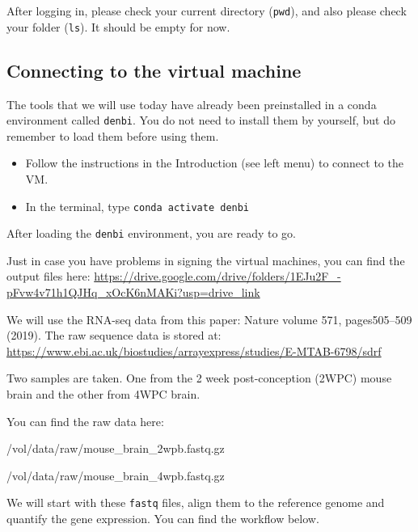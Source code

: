\documentclass[
]{book}
\newenvironment{Shaded}{\begin{snugshade}}{\end{snugshade}}
\newcommand{\NormalTok}[1]{#1}
\providecommand{\tightlist}{%
  \setlength{\itemsep}{0pt}\setlength{\parskip}{0pt}}
\begin{document}
After logging in, please check your current directory (\texttt{pwd}), and also please check your folder (\texttt{ls}). It should be empty for now.

\hypertarget{connecting-to-the-virtual-machine}{%
\subsection{Connecting to the virtual machine}\label{connecting-to-the-virtual-machine}}

The tools that we will use today have already been preinstalled in a conda environment called \texttt{denbi}. You do not need to install them by yourself, but do remember to load them before using them.

\begin{itemize}
\tightlist
\item
  Follow the instructions in the Introduction (see left menu) to connect to the VM.
\item
  In the terminal, type \texttt{conda\ activate\ denbi}
\end{itemize}

After loading the \texttt{denbi} environment, you are ready to go.

Just in case you have problems in signing the virtual machines, you can find the output files here: \url{https://drive.google.com/drive/folders/1EJu2F_-pFvw4v71h1QJHq_xOcK6nMAKi?usp=drive_link}

We will use the RNA-seq data from this paper: Nature volume 571, pages505--509 (2019). The raw sequence data is stored at: \url{https://www.ebi.ac.uk/biostudies/arrayexpress/studies/E-MTAB-6798/sdrf}

Two samples are taken. One from the 2 week post-conception (2WPC) mouse brain and the other from 4WPC brain.

You can find the raw data here:

\begin{Shaded}
\begin{Highlighting}[]
\NormalTok{/vol/data/raw/mouse\_brain\_2wpb.fastq.gz}


\NormalTok{/vol/data/raw/mouse\_brain\_4wpb.fastq.gz}
\end{Highlighting}
\end{Shaded}

We will start with these \texttt{fastq} files, align them to the reference genome and quantify the gene expression. You can find the workflow below.
\end{document}
